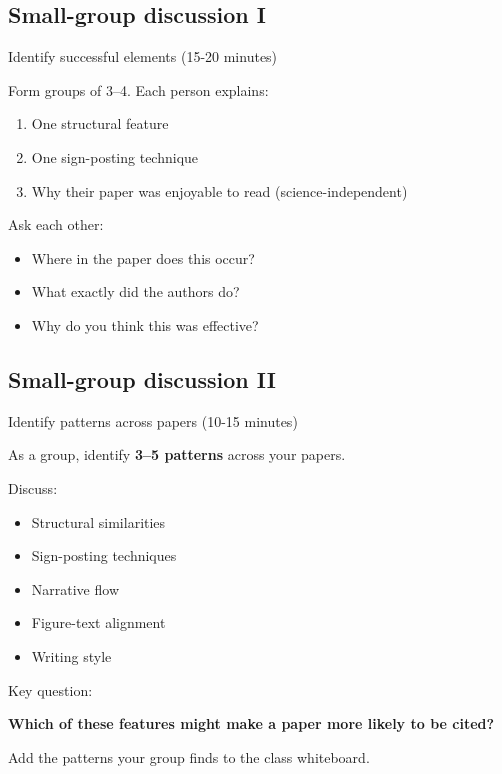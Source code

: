 \documentclass{beamer}
\begin{document}
\subsection{Small-group discussion I}
\begin{frame}{Identify successful elements (15-20 minutes)}

Form groups of 3–4.
Each person explains:

\begin{enumerate}
\item One structural feature
\item One sign-posting technique
\item Why their paper was enjoyable to read (science-independent)
\end{enumerate}

\vspace{0.5cm}

Ask each other:

\begin{itemize}
\item Where in the paper does this occur?
\item What exactly did the authors do?
\item Why do you think this was effective?
\end{itemize}

\end{frame}

\subsection{Small-group discussion II}
\begin{frame}{Identify patterns across papers (10-15 minutes)}

As a group, identify \textbf{3–5 patterns} across your papers.

Discuss:

\begin{itemize}
\item Structural similarities
\item Sign-posting techniques
\item Narrative flow
\item Figure-text alignment
\item Writing style
\end{itemize}

\vspace{0.5cm}

Key question:

\textbf{Which of these features might make a paper more likely to be cited?}

\vspace{0.5cm}
Add the patterns your group finds to the class whiteboard.

\end{frame}
\end{document}

